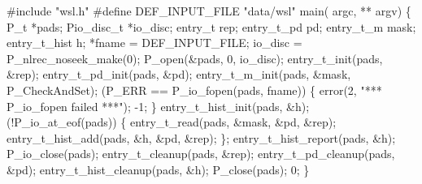 \begin{centercode}
#include "wsl.h"
#define DEF\_INPUT\_FILE  "data/wsl"
\mbox{}
 main( argc, ** argv) \{
  P\_t                   *pads;
  Pio\_disc\_t           *io\_disc;
  entry\_t               rep;
  entry\_t\_pd           pd;
  entry\_t\_m            mask;
  entry\_t\_hist         h;
                *fname = DEF\_INPUT\_FILE;
\mbox{}
  io\_disc = P\_nlrec\_noseek\_make(0);
  P\_open(&pads, 0, io\_disc);
\mbox{}
  entry\_t\_init(pads, &rep);
  entry\_t\_pd\_init(pads, &pd);
  entry\_t\_m\_init(pads, &mask, P\_CheckAndSet);
\mbox{}
   (P\_ERR == P\_io\_fopen(pads, fname)) \{
    error(2, "*** P\_io\_fopen failed ***");
     -1;
  \}
\mbox{}
  entry\_t\_hist\_init(pads, &h);
   (!P\_io\_at\_eof(pads)) \{
    entry\_t\_read(pads, &mask, &pd, &rep);
    entry\_t\_hist\_add(pads, &h, &pd, &rep);
  \};
  entry\_t\_hist\_report(pads, &h);
\mbox{}
  P\_io\_close(pads);
  entry\_t\_cleanup(pads, &rep);
  entry\_t\_pd\_cleanup(pads, &pd);
  entry\_t\_hist\_cleanup(pads, &h);
  P\_close(pads);
   0;
\}
\end{centercode}
